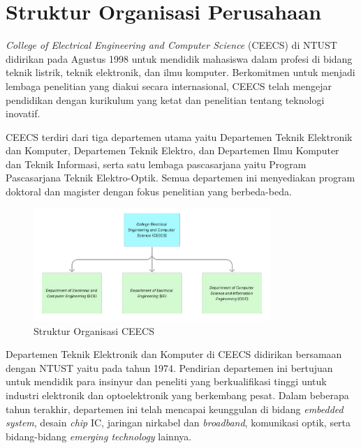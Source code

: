 \section{Struktur Organisasi Perusahaan}

\textit{College of Electrical Engineering and Computer Science} (CEECS) di NTUST didirikan pada Agustus 1998 untuk mendidik mahasiswa dalam profesi di bidang teknik listrik, teknik elektronik, dan ilmu komputer. Berkomitmen untuk menjadi lembaga penelitian yang diakui secara internasional, CEECS telah mengejar pendidikan dengan kurikulum yang ketat dan penelitian tentang teknologi inovatif.

CEECS terdiri dari tiga departemen utama yaitu Departemen Teknik Elektronik dan Komputer, Departemen Teknik Elektro, dan Departemen Ilmu Komputer dan Teknik Informasi, serta satu lembaga pascasarjana yaitu Program Pascasarjana Teknik Elektro-Optik. Semua departemen ini menyediakan program doktoral dan magister dengan fokus penelitian yang berbeda-beda.

\begin{figure}[H]
    \centering
    \includegraphics[width=0.8\textwidth]{assets/pics/ceecs.png}
    \caption{Struktur Organisasi CEECS}
    \label{fig:struktur_ceecs}
\end{figure}

Departemen Teknik Elektronik dan Komputer di CEECS didirikan bersamaan dengan NTUST yaitu pada tahun 1974. Pendirian departemen ini bertujuan untuk mendidik para insinyur dan peneliti yang berkualifikasi tinggi untuk industri elektronik dan optoelektronik yang berkembang pesat. Dalam beberapa tahun terakhir, departemen ini telah mencapai keunggulan di bidang \textit{embedded system}, desain \textit{chip} IC, jaringan nirkabel dan \textit{broadband}, komunikasi optik, serta bidang-bidang \textit{emerging technology} lainnya.

